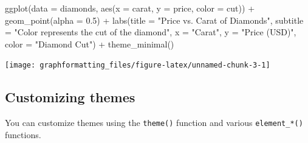 \documentclass[
]{book}
\newenvironment{Shaded}{\begin{snugshade}}{\end{snugshade}}
\newcommand{\AttributeTok}[1]{\textcolor[rgb]{0.77,0.63,0.00}{#1}}
\newcommand{\FloatTok}[1]{\textcolor[rgb]{0.00,0.00,0.81}{#1}}
\newcommand{\FunctionTok}[1]{\textcolor[rgb]{0.00,0.00,0.00}{#1}}
\newcommand{\NormalTok}[1]{#1}
\newcommand{\SpecialCharTok}[1]{\textcolor[rgb]{0.00,0.00,0.00}{#1}}
\newcommand{\StringTok}[1]{\textcolor[rgb]{0.31,0.60,0.02}{#1}}
\begin{document}
\begin{Shaded}
\begin{Highlighting}[]
\FunctionTok{ggplot}\NormalTok{(}\AttributeTok{data =}\NormalTok{ diamonds, }\FunctionTok{aes}\NormalTok{(}\AttributeTok{x =}\NormalTok{ carat, }\AttributeTok{y =}\NormalTok{ price, }\AttributeTok{color =}\NormalTok{ cut)) }\SpecialCharTok{+}
  \FunctionTok{geom\_point}\NormalTok{(}\AttributeTok{alpha =} \FloatTok{0.5}\NormalTok{) }\SpecialCharTok{+}
  \FunctionTok{labs}\NormalTok{(}\AttributeTok{title =} \StringTok{"Price vs. Carat of Diamonds"}\NormalTok{,}
       \AttributeTok{subtitle =} \StringTok{"Color represents the cut of the diamond"}\NormalTok{,}
       \AttributeTok{x =} \StringTok{"Carat"}\NormalTok{,}
       \AttributeTok{y =} \StringTok{"Price (USD)"}\NormalTok{,}
       \AttributeTok{color =} \StringTok{"Diamond Cut"}\NormalTok{) }\SpecialCharTok{+}
  \FunctionTok{theme\_minimal}\NormalTok{()}
\end{Highlighting}
\end{Shaded}

\texttt{[image: graphformatting\_files/figure-latex/unnamed-chunk-3-1]}

\hypertarget{customizing-themes}{%
\subsection{Customizing themes}\label{customizing-themes}}

You can customize themes using the \texttt{theme()} function and various \texttt{element\_*()} functions.
\end{document}
